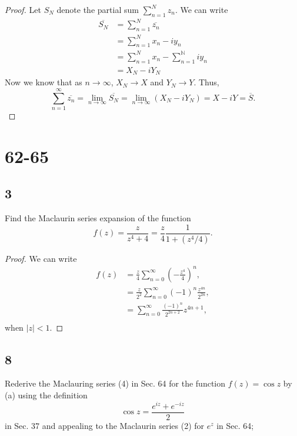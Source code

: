 \documentclass{article}
\newcommand{\N}{\mathbb{N}}
\begin{document}
\begin{proof}
    Let $S_N$ denote the partial sum $\sum_{n=1}^N z_n$. We can write
    \begin{align*}
        \overline{S_N} & = \sum_{n=1}^N \overline{z_n}            \\
                       & = \sum_{n=1}^N x_n - iy_n                \\
                       & =  \sum_{n=1}^N x_n - \sum_{n=1}^\N iy_n \\
                       & = X_N - iY_N
    \end{align*}
    Now we know that as $n\rightarrow\infty$, $X_N\rightarrow X$ and
    $Y_N\rightarrow Y$. Thus,
    \begin{equation*}
        \sum_{n=1}^\infty \overline{z_n} =
        \lim_{n\rightarrow\infty} \overline{S_N} =
        \lim_{n\rightarrow\infty} (X_N - iY_N) = X - iY = \overline{S}.
    \end{equation*}
\end{proof}

\section*{62-65}
\subsection*{3} %
Find the Maclaurin series expansion of the function
\begin{equation*}
    f(z) = \frac{z}{z^4 + 4} = \frac{z}{4}\frac{1}{1 + (z^4/4)}.
\end{equation*}

\begin{proof}
    We can write
    \begin{align*}
        f(z) & = \frac{z}{4}\sum_{n=0}^\infty (-\frac{z^4}{4})^n,                \\
             & = \frac{z}{2^2} \sum_{n = 0}^\infty (-1)^n \frac{z^{4n}}{2^{2n}}, \\
             & = \sum_{n=0}^\infty \frac{(-1)^n}{2^{2n + 2}}z^{4n+1},            \\
    \end{align*}
    when $|z| < 1$.
\end{proof}

\subsection*{8}
Rederive the Maclauring series (4) in Sec. 64 for the function $f(z) = \cos z$ by
(a) using the definition \[\cos z = \frac{e^{iz} + e^{-iz}}{2}\] in Sec. 37
and appealing to the Maclaurin series (2) for $e^z$ in Sec. 64;
\end{document}
